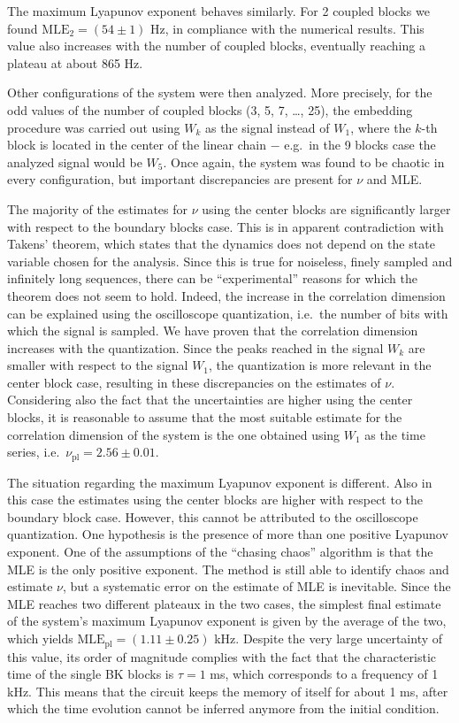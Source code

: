The maximum Lyapunov exponent behaves similarly. For 2 coupled blocks we found $\text{MLE}_2=(54\pm1)$
Hz, in compliance with the numerical results. This value also increases with the number of coupled
blocks, eventually reaching a plateau at about 865 Hz.

Other configurations of the system were then analyzed. More precisely, for the odd values of the
number of coupled blocks (3, 5, 7, \ldots, 25), the embedding procedure was carried out using
$W_k$ as the signal instead of $W_1$, where the $k$-th block is located in the center of the linear
chain $-$ e.g.\ in the 9 blocks case the analyzed signal would be $W_5$. Once again, the system was
found to be chaotic in every configuration, but important discrepancies are present for $\nu$ and MLE\@.

The majority of the estimates for $\nu$ using the center blocks are significantly larger with respect
to the boundary blocks case. This is in apparent contradiction with Takens' theorem, which states that
the dynamics does not depend on the state variable chosen for the analysis. Since this is true for
noiseless, finely sampled and infinitely long sequences, there can be ``experimental'' reasons for
which the theorem does not seem to hold. Indeed, the increase in the correlation dimension can be
explained using the oscilloscope quantization, i.e.\ the number of bits with which the signal is sampled.
We have proven that the correlation dimension increases with the quantization. Since the peaks
reached in the signal $W_k$ are smaller with respect to the signal $W_1$, the quantization is more
relevant in the center block case, resulting in these discrepancies on the estimates of $\nu$.
Considering also the fact that the uncertainties are higher using the center blocks, it is reasonable
to assume that the most suitable estimate for the correlation dimension of the system is the one
obtained using $W_1$ as the time series, i.e.\ $\nu_{\text{pl}}=2.56\pm0.01$.

The situation regarding the maximum Lyapunov exponent is different. Also in this case the estimates using
the center blocks are higher with respect to the boundary block case. However, this cannot be
attributed to the oscilloscope quantization. One hypothesis is the presence of more than
one positive Lyapunov exponent. One of the assumptions of the ``chasing chaos'' algorithm is that
the MLE is the only positive exponent. The method is still able to identify chaos and estimate $\nu$,
but a systematic error on the estimate of MLE is inevitable. Since the MLE reaches two different
plateaux in the two cases, the simplest final estimate of the system's maximum Lyapunov exponent
is given by the average of the two, which yields $\text{MLE}_{\text{pl}}=(1.11\pm0.25)$ kHz. Despite
the very large uncertainty of this value, its order of magnitude complies with the fact that the
characteristic time of the single BK blocks is $\tau=1$ ms, which corresponds to a frequency of 1 kHz.
This means that the circuit keeps the memory of itself for about 1 ms, after which the time evolution
cannot be inferred anymore from the initial condition.

